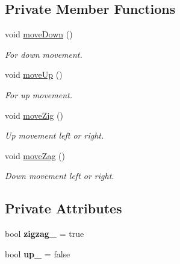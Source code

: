 \subsection*{Private Member Functions}
\begin{DoxyCompactItemize}
\item 
\mbox{\label{class_spider_ace407f694d63ed88367963310747c739}} 
void \mbox{\hyperlink{class_spider_ace407f694d63ed88367963310747c739}{move\+Down}} ()
\begin{DoxyCompactList}\small\item\em For down movement. \end{DoxyCompactList}\item 
\mbox{\label{class_spider_a456d9495aca3a636e584b3d8678596fd}} 
void \mbox{\hyperlink{class_spider_a456d9495aca3a636e584b3d8678596fd}{move\+Up}} ()
\begin{DoxyCompactList}\small\item\em For up movement. \end{DoxyCompactList}\item 
\mbox{\label{class_spider_a7ef566f45e66889f34b3e9d058ac58d0}} 
void \mbox{\hyperlink{class_spider_a7ef566f45e66889f34b3e9d058ac58d0}{move\+Zig}} ()
\begin{DoxyCompactList}\small\item\em Up movement left or right. \end{DoxyCompactList}\item 
\mbox{\label{class_spider_a64bb1061c1e7bf1a3598e817bffe3538}} 
void \mbox{\hyperlink{class_spider_a64bb1061c1e7bf1a3598e817bffe3538}{move\+Zag}} ()
\begin{DoxyCompactList}\small\item\em Down movement left or right. \end{DoxyCompactList}\end{DoxyCompactItemize}
\subsection*{Private Attributes}
\begin{DoxyCompactItemize}
\item 
\mbox{\label{class_spider_adc12c0ff82343b7123401aa7fd53fca8}} 
bool {\bfseries zigzag\+\_\+} = true
\item 
\mbox{\label{class_spider_a2bcc5037a10a7995cb10f7be6299780b}} 
bool {\bfseries up\+\_\+} = false
\end{DoxyCompactItemize}


